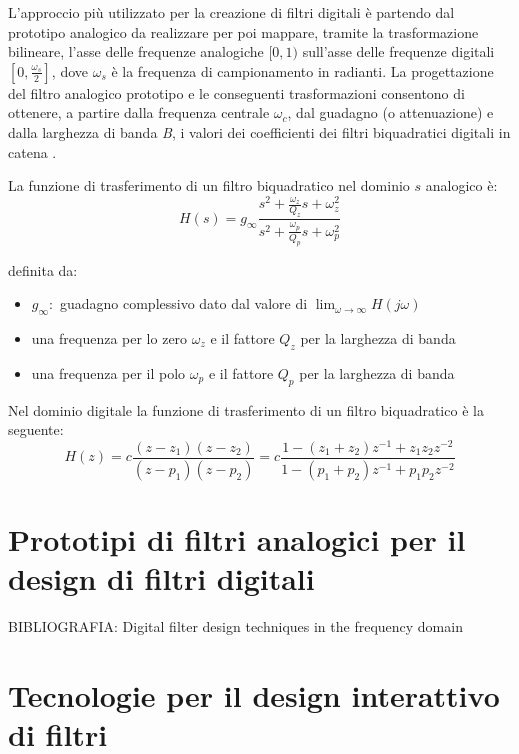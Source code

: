 \documentclass[12pt]{report}
\begin{document}
L'approccio più utilizzato per la creazione di filtri digitali è partendo dal prototipo analogico da realizzare per poi mappare, tramite la trasformazione bilineare, l'asse delle frequenze analogiche \([0,1)\) sull'asse delle frequenze digitali \([0,\frac{\omega_s}{2}]\), dove \(\omega_s\) è la frequenza di campionamento in radianti.
La progettazione del filtro analogico prototipo e le conseguenti trasformazioni consentono di ottenere, a partire dalla frequenza centrale \(\omega_c\), dal guadagno (o attenuazione) e dalla larghezza di banda \textit{B}, i valori dei coefficienti dei filtri biquadratici digitali in catena \parencite{reiss2010design}.

La funzione di trasferimento di un filtro biquadratico nel dominio \( s \) analogico è:
\begin{equation}
    H(s)=g_\infty\frac{s^2 + \frac{\omega_z}{Q_z}s + \omega_z^2}{s^2 + \frac{\omega_p}{Q_p}s + \omega_p^2}
    \label{eq:analog_biquad}
\end{equation}

definita da:
\begin{itemize}
    \item \(g_\infty: \) guadagno complessivo dato dal valore di \(\displaystyle \lim_{\omega \to \infty} H(j\omega) \)
    \item una frequenza per lo zero \(\omega_z\) e il fattore \(Q_z\) per la larghezza di banda
    \item una frequenza per il polo \(\omega_p\) e il fattore \(Q_p\) per la larghezza di banda
\end{itemize}
\parencite{christensen2003generalization}

Nel dominio digitale la funzione di trasferimento di un filtro biquadratico è la seguente:
\begin{equation}
    H(z)=c\frac{(z-z_1)(z-z_2)}{(z-p_1)(z-p_2)} = c\frac{1-(z_1+z_2)z^{-1} + z_1z_2z^{-2}}{1-(p_1+p_2)z^{-1} + p_1p_2z^{-2}}
\end{equation}
\parencite{reiss2010design}

\section{Prototipi di filtri analogici per il design di filtri digitali}
BIBLIOGRAFIA: Digital filter design techniques in the frequency domain

\section{Tecnologie per il design interattivo di filtri}
\end{document}
